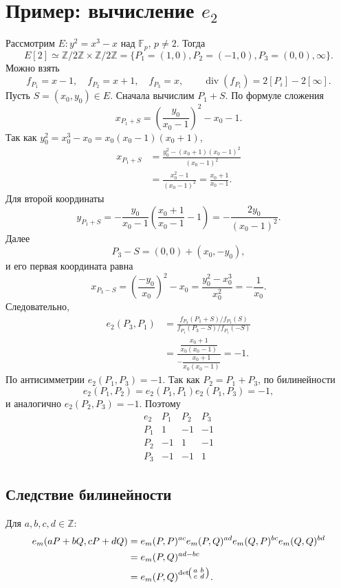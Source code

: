 \documentclass[12pt,a4paper]{article}
\newcommand{\Z}{\mathbb Z}\newcommand{\F}{\mathbb F}\newcommand{\Kbar}{\overline K}
\begin{document}
\section{Пример: вычисление $e_2$}
Рассмотрим $E:y^2=x^3-x$ над $\F_p$, $p\ne2$. Тогда
\[E[2]\simeq\Z/2\Z\times\Z/2\Z=\{P_1=(1,0),P_2=(-1,0),P_3=(0,0),\infty\}.\]
Можно взять
\[f_{P_1}=x-1,\quad f_{P_2}=x+1,\quad f_{P_3}=x,\qquad \operatorname{div}(f_{P_i})=2[P_i]-2[\infty].\]
Пусть $S=(x_0,y_0)\in E$. Сначала вычислим $P_1+S$. По формуле сложения
\[x_{P_1+S}=\left(\frac{y_0}{x_0-1}\right)^2-x_0-1.\]
Так как $y_0^2=x_0^3-x_0=x_0(x_0-1)(x_0+1)$,
\begin{align*}
x_{P_1+S}
&=\frac{y_0^2-(x_0+1)(x_0-1)^2}{(x_0-1)^2}\\
&=\frac{x_0^2-1}{(x_0-1)^2}=\frac{x_0+1}{x_0-1}.
\end{align*}
Для второй координаты
\[y_{P_1+S}=-\frac{y_0}{x_0-1}\left(\frac{x_0+1}{x_0-1}-1\right)=-\frac{2y_0}{(x_0-1)^2}.\]
Далее
\[P_3-S=(0,0)+(x_0,-y_0),\]
и его первая координата равна
\[x_{P_3-S}=\left(\frac{-y_0}{x_0}\right)^2-x_0=\frac{y_0^2-x_0^3}{x_0^2}=-\frac1{x_0}.\]
Следовательно,
\begin{align*}
e_2(P_3,P_1)
&=\frac{f_{P_3}(P_1+S)/f_{P_3}(S)}{f_{P_1}(P_3-S)/f_{P_1}(-S)}\\
&=\frac{\dfrac{x_0+1}{x_0(x_0-1)}}{-\dfrac{x_0+1}{x_0(x_0-1)}}=-1.
\end{align*}
По антисимметрии $e_2(P_1,P_3)=-1$. Так как $P_2=P_1+P_3$, по билинейности
\[e_2(P_1,P_2)=e_2(P_1,P_1)e_2(P_1,P_3)=-1,\]
и аналогично $e_2(P_2,P_3)=-1$. Поэтому
\[\begin{array}{c|ccc}e_2&P_1&P_2&P_3\\\hline P_1&1&-1&-1\\P_2&-1&1&-1\\P_3&-1&-1&1\end{array}\]

\subsection*{Следствие билинейности}
Для $a,b,c,d\in\Z$:
\begin{align*}
e_m(aP+bQ,cP+dQ)
&=e_m(P,P)^{ac}e_m(P,Q)^{ad}e_m(Q,P)^{bc}e_m(Q,Q)^{bd}\\
&=e_m(P,Q)^{ad-bc}\\
&=e_m(P,Q)^{\det\!\begin{psmallmatrix}a&b\\c&d\end{psmallmatrix}}.
\end{align*}
\end{document}
